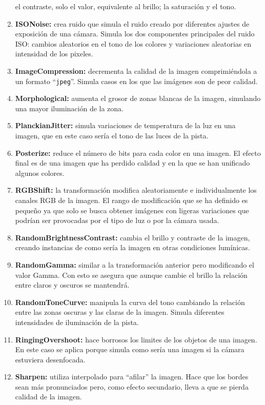 \documentclass[12pt]{report} %
\begin{document}
\begin{enumerate}
    el contraste, solo el valor, equivalente al brillo; la saturación y el
    tono.
    \item \textbf{ISONoise:} crea ruido que simula el ruido creado por
    diferentes ajustes de exposición de una cámara.  Simula los dos componentes
    principales del ruido ISO: cambios aleatorios en el tono de los colores y
    variaciones aleatorias en intensidad de los pixeles.
    \item \textbf{ImageCompression:} decrementa la calidad de la imagen
    comprimiéndola a un formato ``\verb!jpeg!''. Simula casos en los que las imágenes
    son de peor calidad.
    \item \textbf{Morphological:} aumenta el grosor de
    zonas blancas de la imagen, simulando una mayor iluminación de la zona.
    \item \textbf{PlanckianJitter:} simula variaciones de temperatura de la luz
    en una imagen, que en este caso sería el tono de las luces de la pista.
    \item \textbf{Posterize:} reduce el número de bits para cada color en una
    imagen. El efecto final es de una imagen que ha perdido calidad y en la que se han
    unificado algunos colores.
    \item \textbf{RGBShift:} la transformación
    modifica aleatoriamente e individualmente los canales RGB de la imagen.  El
    rango de modificación que se ha definido es pequeño ya que solo se busca
    obtener imágenes con ligeras variaciones que podrían ser provocadas por el
    tipo de luz o por la cámara usada.
    \item \textbf{RandomBrightnessContrast:} cambia el brillo y contraste de la
    imagen, creando instancias de como sería la imagen en otras condiciones
    lumínicas.
    \item \textbf{RandomGamma:} similar a la transformación
    anterior pero modificando el valor Gamma. Con esto se asegura que aunque cambie
    el brillo la relación entre claros y oscuros se mantendrá.
    \item \textbf{RandomToneCurve:} manipula la curva del tono cambiando la relación
    entre las zonas oscuras y las claras de la imagen. Simula diferentes
    intensidades de iluminación de la pista.
    \item \textbf{RingingOvershoot:}
    hace borrosos los limites de los objetos de una imagen. En este caso se
    aplica porque simula como sería una imagen si la cámara estuviera
    desenfocada.
    \item \textbf{Sharpen:} utiliza interpolado para ``afilar'' la
    imagen. Hace que los bordes sean más pronunciados pero, como efecto
    secundario, lleva a que se pierda calidad de la imagen.
    \end{enumerate}
\end{document}
